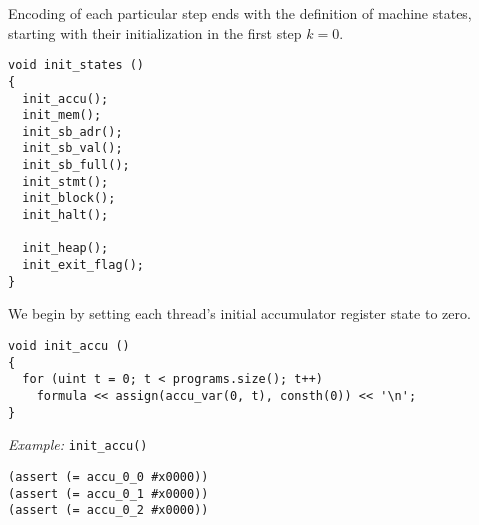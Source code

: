 \noindent
Encoding of each particular step ends with the definition of machine states,
starting with their initialization in the first step $k = 0$.

\begin{lstlisting}[style=c++]
void init_states ()
{
  init_accu();
  init_mem();
  init_sb_adr();
  init_sb_val();
  init_sb_full();
  init_stmt();
  init_block();
  init_halt();

  init_heap();
  init_exit_flag();
}
\end{lstlisting}



\noindent
We begin by setting each thread's initial accumulator register state to zero.

\begin{lstlisting}[style=c++]
void init_accu ()
{
  for (uint t = 0; t < programs.size(); t++)
    formula << assign(accu_var(0, t), consth(0)) << '\n';
}
\end{lstlisting}

\noindent
\emph{Example:} \lstinline[style=c++]{init_accu()}

\begin{lstlisting}[language=SMTLib]
(assert (= accu_0_0 #x0000))
(assert (= accu_0_1 #x0000))
(assert (= accu_0_2 #x0000))
\end{lstlisting}



